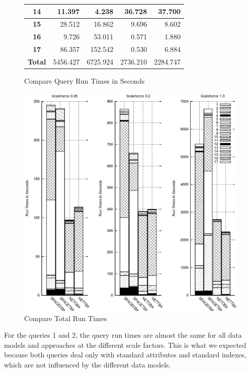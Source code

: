 \documentclass[a4paper]{article}
\begin{document}
\begin{figure}[h]
\begin{minipage}{0.5\linewidth}
\begin{tiny}
\begin{tabular}{|c|r|r|r|r|}
        \hline
        \textbf{14}&11.397&4.238&36.728&37.700\\
        \hline
        \textbf{15}&28.512&16.862&9.696&8.602\\
        \hline
        \textbf{16}&9.726&53.011&0.571&1.880\\
        \hline
        \textbf{17}&86.357&152.542&0.530&6.884\\
        \hline
        \textbf{Total}&5456.427&6725.924&2736.210&2284.747\\
        \hline
      \end{tabular}
    \end{tiny}
  \end{minipage}
 \caption{Compare Query Run Times in Seconds}
 \label{fig:compruntimes}
\end{figure}
\begin{figure}
  \includegraphics[width=1.0\linewidth]{compruntimesall.eps}
  \caption{Compare Total Run Times}
  \label{fig:CompTotalRunTimesGraphic}
\end{figure}

For the queries 1 and 2, the query run times are almost the same for all data models
and approaches at the different scale factors. This is what we expected because
both queries deal only with standard attributes and standard indexes, which
are not influenced by the different data models.
\end{document}
